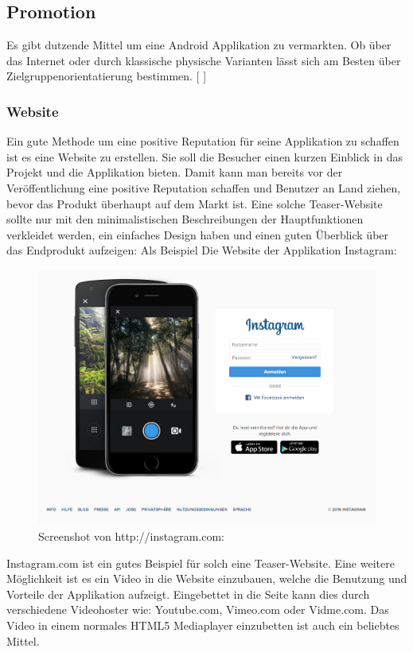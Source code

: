 \documentclass[FIPLY_base.tex]{subfiles}
\begin{document}
\subsection{Promotion}
Es gibt dutzende Mittel um eine Android Applikation zu vermarkten. Ob über das Internet oder durch klassische physische Varianten lässt sich am Besten über Zielgruppenorientatierung bestimmen. 
[ \cite{promteil1}]

\subsubsection{Website}
Ein gute Methode um eine positive Reputation für seine Applikation zu schaffen ist es eine Website zu erstellen. Sie soll die Besucher einen kurzen Einblick in das Projekt und die Applikation bieten. Damit kann man bereits vor der Veröffentlichung eine positive Reputation schaffen und Benutzer an Land ziehen, bevor das Produkt überhaupt auf dem Markt ist. Eine solche Teaser-Website sollte nur mit den minimalistischen Beschreibungen der Hauptfunktionen verkleidet werden, ein einfaches Design haben und einen guten Überblick über das Endprodukt aufzeigen: Als Beispiel Die Website der Applikation Instagram:

\begin{figure}[h]
	\centering
	\includegraphics[scale=0.3]{img/instagramdotcom}
	\caption{Screenshot von http://instagram.com:}
\end{figure}

Instagram.com ist ein gutes Beispiel für solch eine Teaser-Website. 
Eine weitere Möglichkeit ist es ein Video in die Website einzubauen, welche die Benutzung und Vorteile der Applikation aufzeigt. Eingebettet in die Seite kann dies durch verschiedene Videohoster wie: Youtube.com, Vimeo.com oder Vidme.com. Das Video in einem normales HTML5 Mediaplayer einzubetten ist auch ein beliebtes Mittel.
\end{document}
